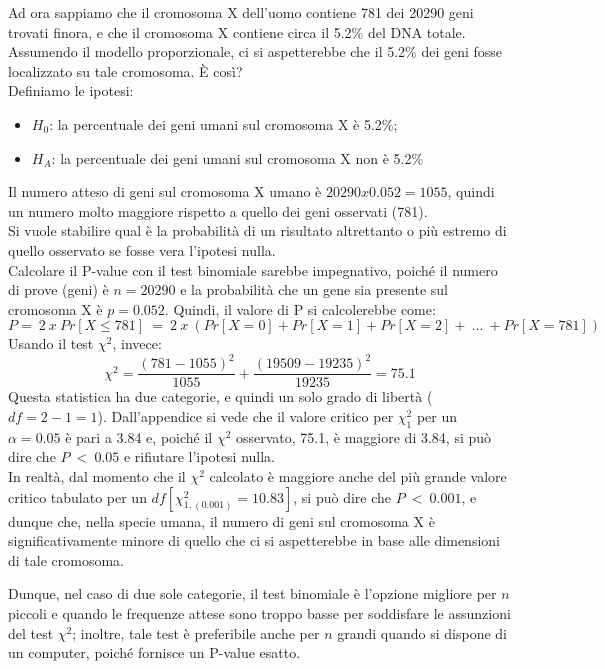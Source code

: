 \documentclass[10pt, draft]{book}
\newcounter{example}[section]
\begin{document}
\begin{example}
    Ad ora sappiamo che il cromosoma X dell'uomo contiene 781 dei 20290 geni trovati finora, e che il cromosoma X contiene circa il 5.2\% del DNA totale.
    \\
    Assumendo il modello proporzionale, ci si aspetterebbe che il 5.2\% dei geni fosse localizzato su tale cromosoma. È così?
    \\
    Definiamo le ipotesi:
    \begin{itemize}
        \item $H_0$: la percentuale dei geni umani sul cromosoma X è 5.2\%;
        \item $H_A$: la percentuale dei geni umani sul cromosoma X non è 5.2\%
    \end{itemize}
    Il numero atteso di geni sul cromosoma X umano è $20290 x 0.052 = 1055$, quindi un numero molto maggiore rispetto a quello dei geni osservati (781).
    \\
    Si vuole stabilire qual è la probabilità di un risultato altrettanto o più estremo di quello osservato se fosse vera l'ipotesi nulla.
    \\
    Calcolare il P-value con il test binomiale sarebbe impegnativo, poiché il numero di prove (geni) è $n = 20290$ e la probabilità che un gene sia presente sul cromosoma X  è $p = 0.052$. Quindi, il valore di P si calcolerebbe come:
    \begin{equation}
    P =\ 2\ x\ Pr[X\le781]\ =\ 2\ x\ (Pr[X=0] + Pr[X=1] + Pr[X = 2] +\ ...\ + Pr[X = 781])
    \end{equation}
    Usando il test $\chi^2$, invece:
    \begin{equation}
    \chi^2 = \frac{(781-1055)^2}{1055}+\frac{(19509-19235)^2}{19235} = 75.1
    \end{equation}
    Questa statistica ha due categorie, e quindi un solo grado di libertà ($df = 2-1 = 1$).
    Dall'appendice %
    si vede che il valore critico per $\chi^2_1$ per un $\alpha=0.05$ è pari a 3.84 e, poiché il $\chi^2$ osservato, 75.1, è maggiore di 3.84, si può dire che $P\ <\ 0.05$ e rifiutare l'ipotesi nulla.
    \\
    In realtà, dal momento che il $\chi^2$ calcolato è maggiore anche del più grande valore critico tabulato per un $df[\chi^2_{1,(0.001)} = 10.83]$, si può dire che $P\ <\ 0.001$, e dunque che, nella specie umana, il numero di geni sul cromosoma X è significativamente minore di quello che ci si aspetterebbe in base alle dimensioni di tale cromosoma.
\end{example}
Dunque, nel caso di due sole categorie, il test binomiale è l'opzione migliore per $n$ piccoli e quando le frequenze attese sono troppo basse per soddisfare le assunzioni del test $\chi^2$; inoltre, tale test è preferibile anche per $n$ grandi quando si dispone di un computer, poiché fornisce un P-value esatto.
\end{document}
